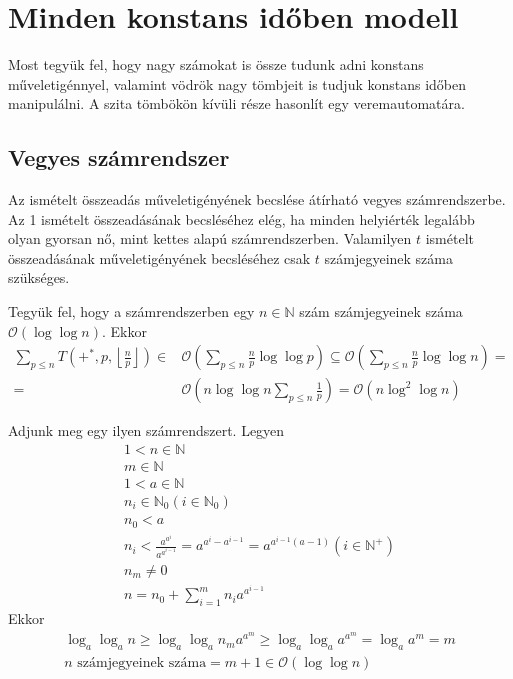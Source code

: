 \documentclass{article}
\begin{document}
\section{Minden konstans időben modell}

Most tegyük fel, hogy nagy számokat is össze tudunk adni konstans műveletigénnyel, valamint vödrök nagy tömbjeit is tudjuk konstans időben manipulálni.
A szita tömbökön kívüli része hasonlít egy veremautomatára.

\subsection{Vegyes számrendszer}

Az ismételt összeadás műveletigényének becslése átírható vegyes számrendszerbe.
Az 1 ismételt összeadásának becsléséhez elég, ha minden helyiérték legalább olyan gyorsan nő, mint kettes alapú számrendszerben.
Valamilyen $t$ ismételt összeadásának műveletigényének becsléséhez csak $t$ számjegyeinek száma szükséges.

Tegyük fel, hogy a számrendszerben egy $n \in \mathbb{N}$ szám számjegyeinek száma $\mathcal{O}(\log{\log{n}})$. Ekkor
\begin{align*}
\sum_{p \le n} T(+^*, p, \left\lfloor \frac{n}{p} \right\rfloor)
\in& \mathcal{O}( \sum_{p \le n} \frac{n}{p} \log{\log{p}} )
\subseteq \mathcal{O}( \sum_{p \le n} \frac{n}{p} \log{\log{n}} ) = \\
=& \mathcal{O}( n \log{\log{n}} \sum_{p \le n} \frac{1}{p} )
= \mathcal{O}( n \log^{2}{\log{n}} )
\end{align*}

Adjunk meg egy ilyen számrendszert. Legyen
\begin{align*}
1 < n \in \mathbb{N} \\
m \in \mathbb{N} \\
1 < a \in \mathbb{N} \\
n_i \in \mathbb{N}_0 (i \in \mathbb{N}_0) \\
n_0 < a \\
n_i < \frac{a^{a^{i}}}{a^{a^{i-1}}} = a^{a^{i}-a^{i-1}} = a^{a^{i-1} (a-1)} (i \in \mathbb{N}^+) \\
n_m \not= 0\\
n = n_0 + \sum_{i=1}^{m} n_i a^{a^{i-1}}
\end{align*}
Ekkor
\begin{align*}
\log_{a}{\log_{a}{n}}
\ge \log_{a}{\log_{a}{n_m a^{a^m}}}
\ge \log_{a}{\log_{a}{a^{a^m}}}
= \log_{a}{a^m}
= m \\
n\text{ számjegyeinek száma} = m + 1 \in \mathcal{O}(\log{\log{n}})
\end{align*}
\end{document}
